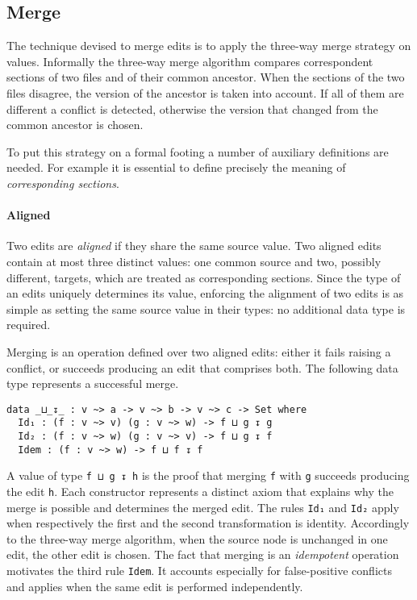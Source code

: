 \documentclass[../Thesis.tex]{subfiles}
\begin{document}
	\subsection{Merge}	
	\label{subsec:Merge}
	The technique devised to merge edits is to apply the three-way
	merge strategy on values. 
	Informally the three-way merge algorithm compares correspondent sections 
	of two files and of their common ancestor.
	When the sections of the two files disagree, the version of the ancestor
	is taken into account. If all of them are different a conflict is detected,
	otherwise the version that changed from the common ancestor is chosen.
	
	To put this strategy on a formal footing a number of auxiliary definitions 
	are needed. For example it is essential to define precisely the meaning 
	of \emph{corresponding sections}. 
	
	\paragraph{Aligned}
	Two edits are \emph{aligned} if they share the same source value.	
	Two aligned edits contain at most three distinct values: 
	one common source and two, 	possibly different, targets, which 
	are treated as corresponding sections.
	Since the type of an edits uniquely determines its value, enforcing
	the alignment of two edits is as simple as setting the same source value 
	in their types: no additional data type is required.
	
	Merging is an operation defined over two aligned edits:
	either it fails raising a conflict, or succeeds producing an edit that 
	comprises both. 
	The following data type represents a successful merge.

\begin{verbatim}	
data _⊔_↧_ : v ~> a -> v ~> b -> v ~> c -> Set where
  Id₁ : (f : v ~> v) (g : v ~> w) -> f ⊔ g ↧ g
  Id₂ : (f : v ~> w) (g : v ~> v) -> f ⊔ g ↧ f
  Idem : (f : v ~> w) -> f ⊔ f ↧ f
\end{verbatim}

	A value of type \texttt{f ⊔ g ↧ h} is the proof that merging \texttt{f} with
	\texttt{g} succeeds producing the edit \texttt{h}.
	Each constructor represents a distinct axiom that explains why
	the merge is possible and determines the merged edit.
	The rules \texttt{Id₁} and \texttt{Id₂} apply when 
	respectively the first and the second transformation is identity.
	Accordingly to the three-way merge algorithm, when the source node
	is unchanged in one edit, the other edit is chosen.
	The fact that merging is an \emph{idempotent} operation motivates the 
	third rule \texttt{Idem}.
	It accounts especially for false-positive conflicts and applies 
	when the same edit is performed independently.
	
\end{document}

